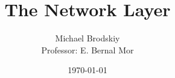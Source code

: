 


\title{The Network Layer}
\date{\today}
\author{Michael Brodskiy\\ \small Professor: E. Bernal Mor}



\maketitle

